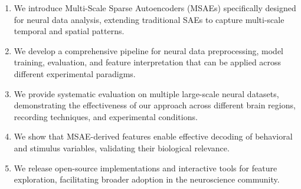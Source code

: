 \begin{enumerate}
\item We introduce Multi-Scale Sparse Autoencoders (MSAEs) specifically designed for neural data analysis, extending traditional SAEs to capture multi-scale temporal and spatial patterns.

\item We develop a comprehensive pipeline for neural data preprocessing, model training, evaluation, and feature interpretation that can be applied across different experimental paradigms.

\item We provide systematic evaluation on multiple large-scale neural datasets, demonstrating the effectiveness of our approach across different brain regions, recording techniques, and experimental conditions.

\item We show that MSAE-derived features enable effective decoding of behavioral and stimulus variables, validating their biological relevance.

\item We release open-source implementations and interactive tools for feature exploration, facilitating broader adoption in the neuroscience community.
\end{enumerate}
